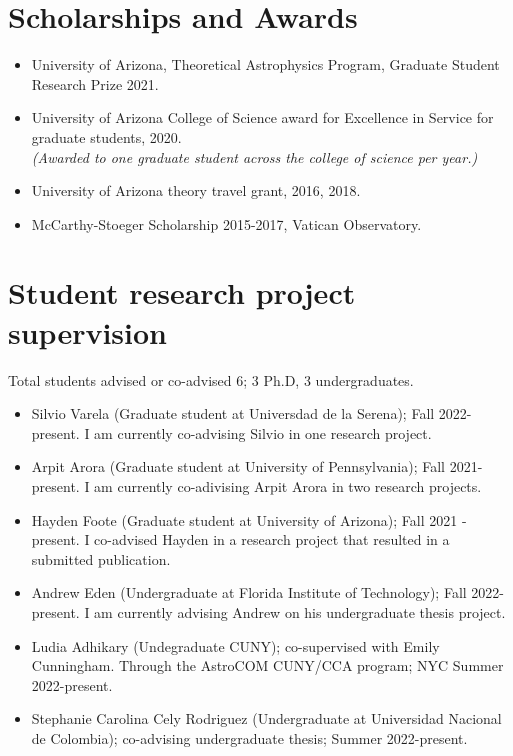 \documentclass[UTF8]{article}
\begin{document}
\section*{Scholarships and Awards}


\begin{itemize}
  \setlength\itemsep{0.0em}
  \renewcommand\labelitemi{$\cdot$}

\item University of Arizona, Theoretical Astrophysics Program, Graduate Student
Research Prize 2021.
\item University of Arizona College of Science award for Excellence in
Service for graduate students, 2020.\\ 
\indent \textit{(Awarded to one graduate student across the college of
science per year.)}
\item University of Arizona theory travel grant, 2016, 2018. 
\item McCarthy-Stoeger Scholarship 2015-2017, Vatican Observatory.
\end{itemize}


\section*{Student research project supervision}

Total students advised or co-advised 6; 3 Ph.D, 3 undergraduates.

\begin{itemize}
  \setlength\itemsep{0.0em}
  \renewcommand\labelitemi{$\cdot$}
  \item Silvio Varela (Graduate student at Universdad de la Serena); Fall 2022-present. I am
    currently co-advising Silvio in one research project. 
  \item Arpit Arora (Graduate student at University of Pennsylvania); Fall 2021-present. I am
    currently co-adivising Arpit Arora in two research projects.
  \item Hayden Foote (Graduate student at University of Arizona); Fall 2021 - present. I co-advised Hayden in a research project that
  resulted in a submitted publication.    
  \item Andrew Eden (Undergraduate at Florida Institute of Technology); Fall 2022-present.
    I am currently advising Andrew on his undergraduate thesis project. 
  \item Ludia Adhikary (Undegraduate CUNY); co-supervised with Emily Cunningham. Through the AstroCOM CUNY/CCA program; NYC Summer 2022-present.
\item Stephanie Carolina Cely Rodriguez (Undergraduate at Universidad Nacional de Colombia);
  co-advising undergraduate thesis; Summer 2022-present.
\end{itemize}
\end{document}
